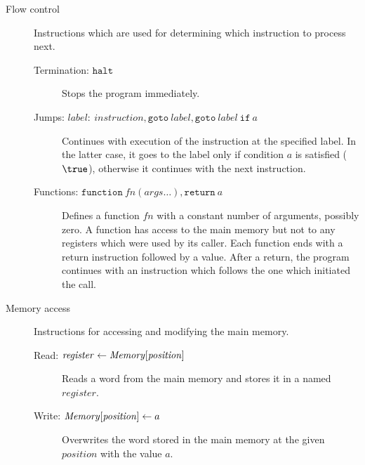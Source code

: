\begin{description}
	\item[Flow control]
	Instructions which are used for determining which instruction to process next.
	\begin{description}
		\item[Termination: \textnormal{$\texttt{halt}$}]
		Stops the program immediately.
		\item[Jumps: \textnormal{$\mathit{label}{:}\ \mathit{instruction}, \texttt{goto}\ \mathit{label}, \texttt{goto}\ \mathit{label}\ \texttt{if}\ a$}]
		Continues with execution of the instruction at the specified label.
		In the latter case, it goes to the label only if condition $a$ is satisfied ($\true$), otherwise it continues with the next instruction.
		\item[Functions: \textnormal{$\texttt{function}\ \mathit{fn}(\mathit{args}\ldots), \texttt{return}\ a$}]
		Defines a function $\mathit{fn}$ with a constant number of arguments, possibly zero.
		A function has access to the main memory but not to any registers which were used by its caller.
		Each function ends with a return instruction followed by a value.
		After a return, the program continues with an instruction which follows the one which initiated the call.
	\end{description}
	
	\item[Memory access]
	Instructions for accessing and modifying the main memory.
	\begin{description}
		\item[Read: $\mathit{register} \gets \mathit{Memory}[\mathit{position}\char93$]
		Reads a word from the main memory and stores it in a named $\mathit{register}$.
		\item[Write: $\mathit{Memory}[\mathit{position}\char93 \gets a$]
		Overwrites the word stored in the main memory at the given $position$ with the value $a$.
	\end{description}
	

\end{description}
